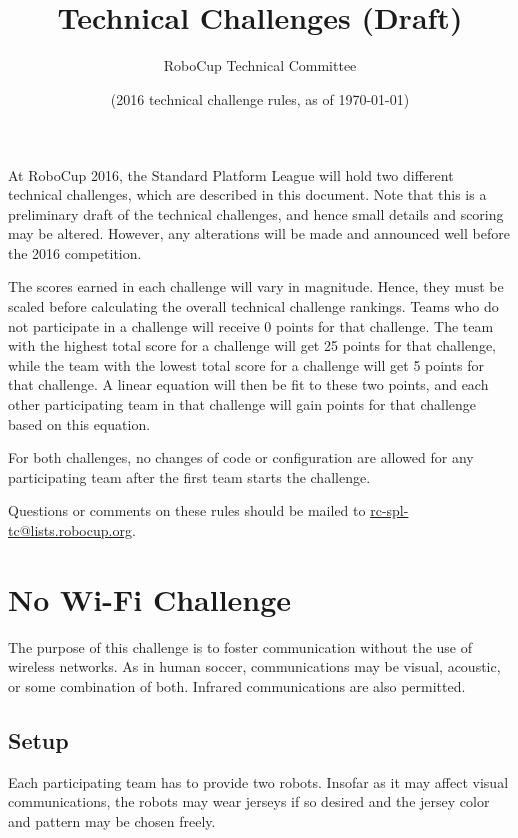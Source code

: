 \documentclass[12pt]{article}
\title{\leaguename \\ Technical Challenges (Draft)}
\author{RoboCup Technical Committee}
\date{(2016 technical challenge rules, as of \today)}
\begin{document}
\maketitle

At RoboCup 2016, the Standard Platform League will hold two different technical challenges, which are described in this document.  Note that this is a preliminary draft of the technical challenges, and hence small details and scoring may be altered.  However, any alterations will be made and announced well before the 2016 competition.

The scores earned in each challenge will vary in magnitude.  Hence, they must be scaled before calculating the overall technical challenge rankings.  Teams who do not participate in a challenge will receive 0 points for that challenge.  The team with the highest total score for a challenge will get 25 points for that challenge, while the team with the lowest total score for a challenge will get 5 points for that challenge.  A linear equation will then be fit to these two points, and each other participating team in that challenge will gain points for that challenge based on this equation.

For both challenges, no changes of code or configuration are allowed for any participating team after the first team starts the challenge. 

Questions or comments on these rules should be mailed to {\small \url{rc-spl-tc@lists.robocup.org}}.

\vfill

\renewcommand\contentsname{Challenges}
\tableofcontents
\setcounter{tocdepth}{1}

\thispagestyle{fancy}

\clearpage

\cfoot{\thepage}
\setcounter{page}{1}

\newcommand{\openMinNum}{three}




\section{No Wi-Fi Challenge}

The purpose of this challenge is to foster communication without the use of wireless networks.
As in human soccer, communications may be visual, acoustic, or some combination of both.
Infrared communications are also permitted.

\subsection{Setup}
Each participating team has to provide two robots. Insofar as it may affect visual communications,
the robots may wear jerseys if so desired and the
jersey color and pattern may be chosen freely. 
\end{document}
